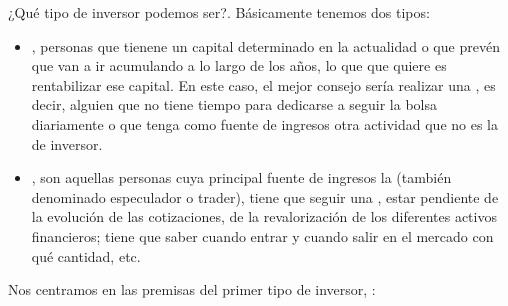 ¿Qué tipo de inversor podemos ser?. Básicamente tenemos dos tipos:
\begin{itemize}
    \item {}, personas que tienene un capital determinado en la actualidad o que prevén que van a ir acumulando a lo largo de los años, lo que que quiere es rentabilizar ese capital. En este caso, el mejor consejo sería realizar una , es decir, alguien que no tiene tiempo para dedicarse a seguir la bolsa diariamente o que tenga como fuente de ingresos otra actividad que no es la de inversor.
    \item {},  son aquellas personas cuya principal fuente de ingresos la  (también denominado especulador o trader), tiene que seguir una , estar pendiente de la evolución de las cotizaciones, de la revalorización de los diferentes activos financieros; tiene que saber cuando entrar y cuando salir en el mercado con qué cantidad, etc.
\end{itemize}

Nos centramos en las premisas del primer tipo de inversor, :

